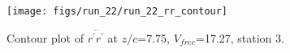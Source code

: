\begin{figure}[H]
\centering
\texttt{[image: figs/run\_22/run\_22\_rr\_contour]}
\caption{Contour plot of $\overline{r^\prime r^\prime}$ at $z/c$=7.75, $V_{free}$=17.27, station 3.}
\label{fig:run_22_rr_contour}
\end{figure}


